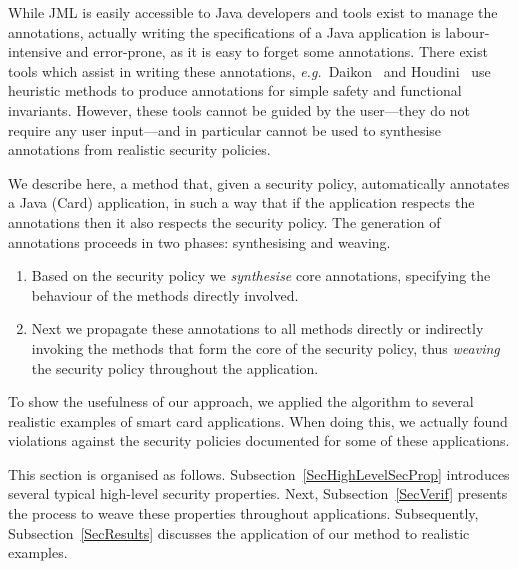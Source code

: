 
While JML is easily accessible to Java developers and tools exist
to manage the annotations, actually writing
the specifications of a Java application is labour-intensive and
error-prone, as it is easy to forget some annotations. There
exist tools which assist in writing these annotations,
\emph{e.g.}~Daikon~\cite{ErnstCGN2001:TSE} and Houdini~\cite{FlanaganL01}
use heuristic methods to produce annotations for simple safety and
functional invariants.  However, these tools cannot be guided by the
user---they do not require any user input---and in particular cannot
be used to synthesise annotations from realistic security policies.

We describe here, a method that, given a security policy,
automatically annotates a Java (Card) application, in such a way that
if the application respects the annotations then it also respects the
security policy. The generation of annotations proceeds in two phases:
synthesising and weaving.
\begin{enumerate}
\item Based on the security policy we \emph{synthesise} core annotations, 
specifying the behaviour of the methods directly involved.
\item Next we propagate these annotations to all methods directly or
indirectly invoking the methods that form the core of the security
policy, thus \emph{weaving} the security policy throughout the
application. 
\end{enumerate} 

To show the usefulness of our approach, we applied the algorithm to
several realistic examples of smart card applications. When doing
this, we actually found violations against the security policies
documented for some of these applications.

This section is organised as follows. Subsection~\ref{SecHighLevelSecProp}
introduces several typical high-level security properties. Next,
Subsection~\ref{SecVerif} presents the process to weave these properties
throughout applications. Subsequently, Subsection~\ref{SecResults}
discusses the application of our method to realistic
examples.






